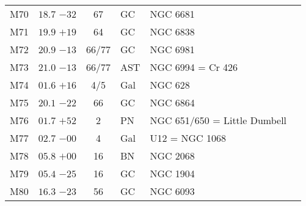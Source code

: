 \begin{table}[t]
\begin{tabular}{lcclll}
M70  &$18.7$ $-32$&67&GC &NGC 6681\\
M71  &$19.9$ $+19$&64&GC &NGC 6838\\
M72  &$20.9$ $-13$&66/77&GC &NGC 6981\\
M73  &$21.0$ $-13$&66/77&AST&NGC 6994 = Cr 426\\
M74  &$01.6$ $+16$&4/5&Gal&NGC 628\\
M75  &$20.1$ $-22$&66&GC &NGC 6864\\
M76  &$01.7$ $+52$&2&PN &NGC 651/650 = Little Dumbell\\
M77  &$02.7$ $-00$&4&Gal&U12 = NGC 1068\\
M78  &$05.8$ $+00$&16&BN &NGC 2068\\
M79  &$05.4$ $-25$&16&GC &NGC 1904\\
M80  &$16.3$ $-23$&56&GC &NGC 6093\\
\hline
\end{tabular}
\end{table}

